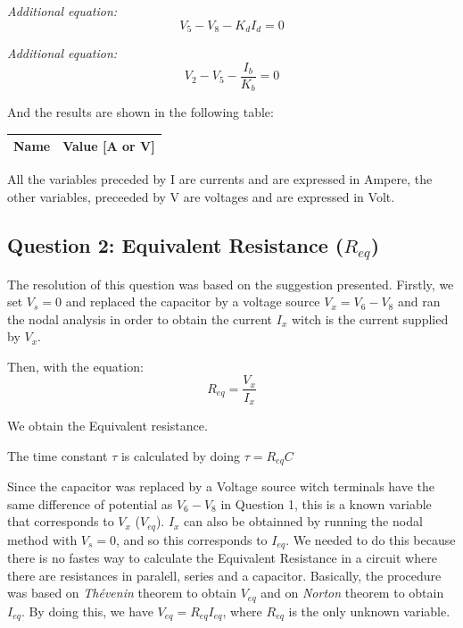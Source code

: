 \emph{Additional equation:}
\begin{equation}
     V_5 - V_8 - K_dI_d = 0
\end{equation}\par

\emph{Additional equation:}
\begin{equation}
     V_2 - V_5 - \frac{I_b}{K_b} = 0
\end{equation}\par

And the results are shown in the following table:

\begin{center}
  \begin{tabular}{ | c | c | }
    \hline    
    {\bf Name} & {\bf Value [A or V]} \\ \hline
    
    \hline
  \end{tabular}
\end{center}
All the variables preceded by I are currents and are expressed in Ampere, the other variables, preceeded by V are voltages and are expressed in Volt.



\subsection{Question 2: Equivalent Resistance ($R_{eq}$)}
The resolution of this question was based on the suggestion presented. Firstly, we set $V_s =0$ and replaced the capacitor by a voltage source $V_x = V_6 - V_8$ and ran the nodal analysis in order to obtain the current $I_x$ witch is the current supplied by $V_x$.\par
Then, with the equation: 
\begin{equation}
     R_{eq} = \frac{V_x}{I_x}
\end{equation}\par
We obtain the Equivalent resistance. \par 
The time constant $\tau$ is calculated by doing $\tau=R_{eq}C$\par
Since the capacitor was replaced by a Voltage source witch terminals have the same difference of potential as $V_6 - V_8$ in Question 1, this is a known variable that corresponds to $V_x$ ($V_{eq}$). $I_x$ can also be obtainned by running the nodal method with $V_s = 0$, and so this corresponds to $I_{eq}$. We needed to do this because there is no fastes way to calculate the Equivalent Resistance in a circuit where there are resistances in paralell, series and a capacitor. Basically, the procedure was based on \emph{Thévenin} theorem to obtain $V_{eq}$ and on \emph{Norton} theorem to obtain $I_{eq}$. By doing this, we have $V_{eq}=R_{eq}I_{eq}$, where $R_{eq}$ is the only unknown variable. \par

